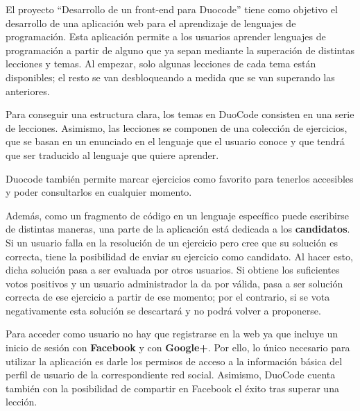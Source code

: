
El proyecto ``Desarrollo de un front-end para Duocode'' tiene como objetivo el desarrollo de una aplicación web para el aprendizaje de lenguajes de programación. Esta aplicación permite a los usuarios aprender lenguajes de programación a partir de alguno que ya sepan mediante la superación de distintas lecciones y temas. Al empezar, solo algunas lecciones de cada tema están disponibles; el resto se van desbloqueando a medida que se van superando las anteriores.

Para conseguir una estructura clara, 
los temas en DuoCode consisten en una serie de lecciones. Asimismo, las lecciones se componen de una colección
de ejercicios, que se basan en un enunciado en el lenguaje que el usuario conoce y que tendrá que ser
traducido al lenguaje que quiere aprender.

Duocode también permite marcar ejercicios como favorito para tenerlos accesibles y poder consultarlos en cualquier momento.

Además, como un fragmento de código en un lenguaje específico puede escribirse de distintas maneras, una parte de la aplicación está dedicada a los \textbf{candidatos}. Si un usuario falla en la resolución de un ejercicio pero cree que su solución es correcta, tiene la posibilidad de enviar su ejercicio como candidato. Al hacer esto, dicha solución pasa a ser evaluada por otros usuarios. Si obtiene los suficientes votos positivos y un usuario administrador la da por válida, pasa a ser solución correcta de ese ejercicio a partir de ese momento; por
el contrario, si se vota negativamente esta solución se descartará y no podrá volver a proponerse.

Para acceder como usuario no hay que registrarse en la web ya que incluye un inicio de sesión con \textbf{Facebook} y con \textbf{Google+}. Por ello, lo único necesario para utilizar la aplicación es
darle los permisos de acceso a la información básica del perfil de usuario de la correspondiente red social. Asimismo, DuoCode cuenta también con la posibilidad de compartir en Facebook el éxito tras superar una lección.

 

